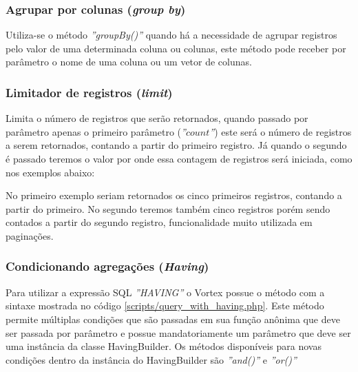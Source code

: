 \spaceH{}

\label{scripts/query_with_order_by_variations.php}

\subsubsection{Agrupar por colunas (\textit{group by})}

Utiliza-se o método \textit{''groupBy()''} quando há a necessidade de agrupar registros pelo valor de uma determinada coluna ou colunas, este método pode receber por parâmetro o nome de uma coluna ou um vetor de colunas.

\spaceH{}

\label{scripts/query_with_group_by.php}

\subsubsection{Limitador de registros (\textit{limit})}

Limita o número de registros que serão retornados, quando passado por parâmetro apenas o primeiro parâmetro (\textit{''$count$''}) este será o número de registros a serem retornados, contando a partir do primeiro registro. Já quando o segundo é passado teremos o valor por onde essa contagem de registros será iniciada, como nos exemplos abaixo:

\spaceH{}

\label{scripts/query_with_limit.php}

No primeiro exemplo seriam retornados os cinco primeiros registros, contando a partir do primeiro. No segundo teremos também cinco registros porém sendo contados a partir do segundo registro, funcionalidade muito utilizada em paginações.

\subsubsection{Condicionando agregações (\textit{Having})}

Para utilizar a expressão SQL \textit{''HAVING''} o Vortex possue o método com a sintaxe mostrada no código \ref{scripts/query_with_having.php}. Este método permite múltiplas condições que são passadas em sua função anônima que deve ser passada por parâmetro e possue mandatoriamente um parâmetro que deve ser uma instância da classe HavingBuilder. Os métodos disponíveis para novas condições dentro da instância do HavingBuilder são \textit{''and()''} e \textit{''or()''}

